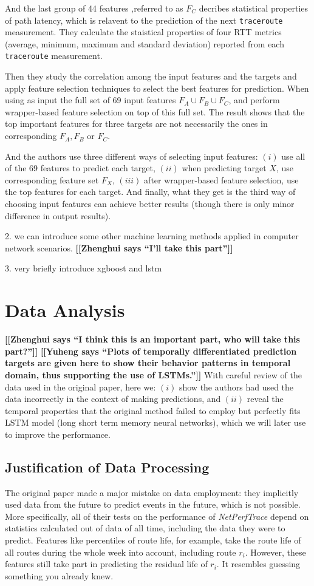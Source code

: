 \documentclass[sigconf]{acmart}
\newcommand{\heng}[1]{{\bf \color{cyan} [[Yuheng says ``#1'']]}}
\newcommand{\hui}[1]{{\bf \color{purple} [[Zhenghui says ``#1'']]}}
\begin{document}
	And the last group of 44 features ,referred to as $F_C$ decribes statistical properties of path latency, which is relavent to the prediction of the next \texttt{traceroute} measurement. They calculate the staistical properties of four RTT metrics (average, minimum, maximum and standard deviation) reported from each \texttt{traceroute} measurement.
	
	
	Then they study the correlation among the input features and the targets and apply  feature selection techniques to select the best features for prediction. When using as input the full set of 69 input features $F_A \cup F_B \cup F_C$, and perform wrapper-based feature selection on top of this full set. The result shows that the top important features for three targets are not necessarily the ones in corresponding $F_A,F_B$ or $F_C$.
	
	
	And the authors use three different ways of selecting input features: $(i)$  use all of the 69 features to predict each target, $(ii)$ when predicting target $X$, use corresponding feature set $F_X$, $(iii)$ after wrapper-based feature selection, use the top features for each target. And finally, what they get is the third way of choosing input features can achieve better results (though there is only minor difference in output results).
	
	
	2. we can introduce some other machine learning methods applied in computer network scenarios. \hui{I'll take this part}
	
	
	
	3. very briefly introduce xgboost and lstm
	
	
	\section{Data Analysis}
	\label{sec:dataAna}
	\hui{I think this is an important part, who will take this part?}
	\heng{Plots of temporally differentiated prediction targets are given here to show their behavior patterns in temporal domain, thus supporting the use of LSTMs.}
	With careful review of the data used in the original paper, here we: $(i)$ show the authors had used the data incorrectly in the context of making predictions, and $(ii)$ reveal the temporal properties that the original method failed to employ but perfectly fits LSTM model (long short term memory neural networks), which we will later use to improve the performance.
	\subsection{Justification of Data Processing}
	The original paper \cite{oripaper} made a major mistake on data employment: they implicitly used data from the future to predict events in the future, which is not possible. More specifically, all of their tests on the performance of \textit{NetPerfTrace} depend on statistics calculated out of data of all time, including the data they were to predict. Features like percentiles of route life, for example, take the route life of all routes during the whole week into account, including route $r_i$. However, these features still take part in predicting the residual life of $r_i$. It resembles guessing something you already knew.
	
\end{document}
